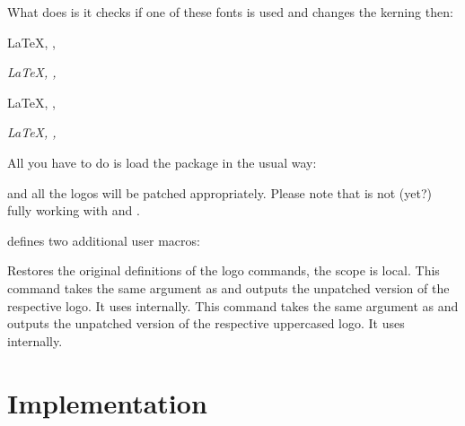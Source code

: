 \documentclass{cnpkgdoc}
\begin{document}
What \lbthlpt does is it checks if one of these fonts is used and changes the
kerning then:

\begin{beispiel}
 \huge
 \LaTeX, \XeLaTeX, \LaTeXTeX \par
 \textit{\LaTeX, \XeLaTeX, \LaTeXTeX}
 
 \sffamily
 \LaTeX, \XeLaTeX, \LaTeXTeX \par
 \textit{\LaTeX, \XeLaTeX, \LaTeXTeX}
\end{beispiel}

All you have to do is load the package in the usual \LaTeXe{} way:
\begin{beispiel}
 \usepackage{libertinehologopatch}
\end{beispiel}
and all the logos will be patched appropriately. Please note that \lbthlpt is
not (yet?) fully working with \XeLaTeX{} and \LuaLaTeX.

\lbthlpt defines two additional user macros:
\begin{beschreibung}
 \newline
   Restores the original definitions of the logo commands, the scope is local.
 \newline
   This command takes the same argument as  and outputs the unpatched
   version of the respective logo. It uses  internally.
 \newline
   This command takes the same argument as  and outputs the unpatched
   version of the respective uppercased logo. It uses  internally.
\end{beschreibung}



\section{Implementation}
\implementation

\printindex
\end{document}
